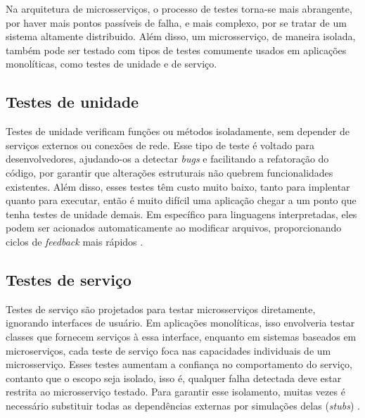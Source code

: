 Na arquitetura de microsserviços, o processo de testes torna-se mais abrangente, por haver mais pontos passíveis de falha, e mais complexo, por se tratar de um sistema altamente distribuido. Além disso, um microsserviço, de maneira isolada, também pode ser testado com tipos de testes comumente usados em aplicações monolíticas, como testes de unidade e de serviço.


\subsection{Testes de unidade}
Testes de unidade verificam funções ou métodos isoladamente, sem depender de serviços externos ou conexões de rede. Esse tipo de teste é voltado para desenvolvedores, ajudando-os a detectar \emph{bugs} e facilitando a refatoração do código, por garantir que alterações estruturais não quebrem funcionalidades existentes. Além disso, esses testes têm custo muito baixo, tanto para implentar quanto para executar, então é muito difícil uma aplicação chegar a um ponto que tenha testes de unidade demais. Em específico para linguagens interpretadas, eles podem ser acionados automaticamente ao modificar arquivos, proporcionando ciclos de \emph{feedback} mais rápidos \cite{livro-building-microservices}. 

\subsection{Testes de serviço}
Testes de serviço são projetados para testar microsserviços diretamente, ignorando interfaces de usuário. Em aplicações monolíticas, isso envolveria testar classes que fornecem serviços à essa interface, enquanto em sistemas baseados em microserviços, cada teste de serviço foca nas capacidades individuais de um microsserviço. Esses testes aumentam a confiança no comportamento do serviço, contanto que o escopo seja isolado, isso é, qualquer falha detectada deve estar restrita ao microsserviço testado. Para garantir esse isolamento, muitas vezes é necessário substituir todas as dependências externas por simulações delas (\emph{stubs}) \cite{livro-building-microservices}.

